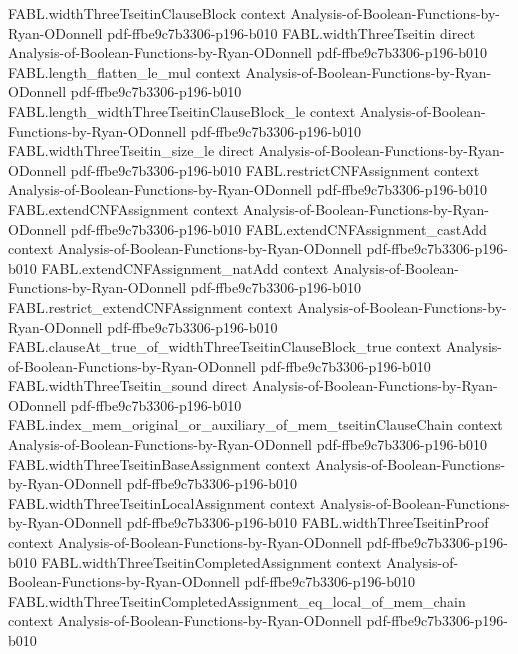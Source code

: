 \begin{theorem}
  {FABL.widthThreeTseitinClauseBlock}
  {context}
  {Analysis-of-Boolean-Functions-by-Ryan-ODonnell}
  {pdf-ffbe9c7b3306-p196-b010}
\proofstep
  {FABL.widthThreeTseitin}
  {direct}
  {Analysis-of-Boolean-Functions-by-Ryan-ODonnell}
  {pdf-ffbe9c7b3306-p196-b010}
\proofstep
  {FABL.length_flatten_le_mul}
  {context}
  {Analysis-of-Boolean-Functions-by-Ryan-ODonnell}
  {pdf-ffbe9c7b3306-p196-b010}
\proofstep
  {FABL.length_widthThreeTseitinClauseBlock_le}
  {context}
  {Analysis-of-Boolean-Functions-by-Ryan-ODonnell}
  {pdf-ffbe9c7b3306-p196-b010}
\proofstep
  {FABL.widthThreeTseitin_size_le}
  {direct}
  {Analysis-of-Boolean-Functions-by-Ryan-ODonnell}
  {pdf-ffbe9c7b3306-p196-b010}
\proofstep
  {FABL.restrictCNFAssignment}
  {context}
  {Analysis-of-Boolean-Functions-by-Ryan-ODonnell}
  {pdf-ffbe9c7b3306-p196-b010}
\proofstep
  {FABL.extendCNFAssignment}
  {context}
  {Analysis-of-Boolean-Functions-by-Ryan-ODonnell}
  {pdf-ffbe9c7b3306-p196-b010}
\proofstep
  {FABL.extendCNFAssignment_castAdd}
  {context}
  {Analysis-of-Boolean-Functions-by-Ryan-ODonnell}
  {pdf-ffbe9c7b3306-p196-b010}
\proofstep
  {FABL.extendCNFAssignment_natAdd}
  {context}
  {Analysis-of-Boolean-Functions-by-Ryan-ODonnell}
  {pdf-ffbe9c7b3306-p196-b010}
\proofstep
  {FABL.restrict_extendCNFAssignment}
  {context}
  {Analysis-of-Boolean-Functions-by-Ryan-ODonnell}
  {pdf-ffbe9c7b3306-p196-b010}
\proofstep
  {FABL.clauseAt_true_of_widthThreeTseitinClauseBlock_true}
  {context}
  {Analysis-of-Boolean-Functions-by-Ryan-ODonnell}
  {pdf-ffbe9c7b3306-p196-b010}
\proofstep
  {FABL.widthThreeTseitin_sound}
  {direct}
  {Analysis-of-Boolean-Functions-by-Ryan-ODonnell}
  {pdf-ffbe9c7b3306-p196-b010}
\proofstep
  {FABL.index_mem_original_or_auxiliary_of_mem_tseitinClauseChain}
  {context}
  {Analysis-of-Boolean-Functions-by-Ryan-ODonnell}
  {pdf-ffbe9c7b3306-p196-b010}
\proofstep
  {FABL.widthThreeTseitinBaseAssignment}
  {context}
  {Analysis-of-Boolean-Functions-by-Ryan-ODonnell}
  {pdf-ffbe9c7b3306-p196-b010}
\proofstep
  {FABL.widthThreeTseitinLocalAssignment}
  {context}
  {Analysis-of-Boolean-Functions-by-Ryan-ODonnell}
  {pdf-ffbe9c7b3306-p196-b010}
\proofstep
  {FABL.widthThreeTseitinProof}
  {context}
  {Analysis-of-Boolean-Functions-by-Ryan-ODonnell}
  {pdf-ffbe9c7b3306-p196-b010}
\proofstep
  {FABL.widthThreeTseitinCompletedAssignment}
  {context}
  {Analysis-of-Boolean-Functions-by-Ryan-ODonnell}
  {pdf-ffbe9c7b3306-p196-b010}
\proofstep
  {FABL.widthThreeTseitinCompletedAssignment_eq_local_of_mem_chain}
  {context}
  {Analysis-of-Boolean-Functions-by-Ryan-ODonnell}
  {pdf-ffbe9c7b3306-p196-b010}

\end{theorem}
